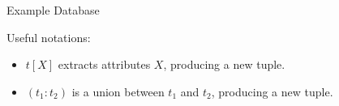 \begin{multicols}{2}
\begin{CheatsheetEntryFrame}
\begin{SqlAltSubsection}{Example Database}
\begin{center}
        \end{center}
        \end{SqlAltSubsection}

    \end{CheatsheetEntryFrame}

    \begin{CheatsheetEntryFrame}



        Useful notations:
        \begin{itemize}
            \item $t[X]$ extracts attributes $X$, producing a new tuple.
            \item $(t_1 : t_2)$ is a union between $t_1$ and $t_2$, producing a new tuple.
        \end{itemize}

    \end{CheatsheetEntryFrame}

\end{multicols}
\newpage
